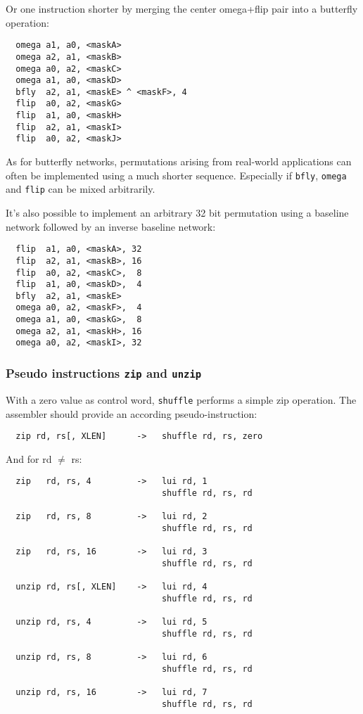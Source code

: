 Or one instruction shorter by merging the center omega+flip pair into a
butterfly operation:

\begin{verbatim}
  omega a1, a0, <maskA>
  omega a2, a1, <maskB>
  omega a0, a2, <maskC>
  omega a1, a0, <maskD>
  bfly  a2, a1, <maskE> ^ <maskF>, 4
  flip  a0, a2, <maskG>
  flip  a1, a0, <maskH>
  flip  a2, a1, <maskI>
  flip  a0, a2, <maskJ>
\end{verbatim}

As for butterfly networks, permutations arising from real-world applications
can often be implemented using a much shorter sequence. Especially if {\tt bfly},
{\tt omega} and {\tt flip} can be mixed arbitrarily.

It's also possible to implement an arbitrary 32 bit permutation using a
baseline network followed by an inverse baseline network:

\begin{verbatim}
  flip  a1, a0, <maskA>, 32
  flip  a2, a1, <maskB>, 16
  flip  a0, a2, <maskC>,  8
  flip  a1, a0, <maskD>,  4
  bfly  a2, a1, <maskE>
  omega a0, a2, <maskF>,  4
  omega a1, a0, <maskG>,  8
  omega a2, a1, <maskH>, 16
  omega a0, a2, <maskI>, 32
\end{verbatim}

\subsubsection{Pseudo instructions {\tt zip} and {\tt unzip}}

With a zero value as control word, {\tt shuffle} performs a simple zip
operation. The assembler should provide an according pseudo-instruction:

\begin{verbatim}
  zip rd, rs[, XLEN]      ->   shuffle rd, rs, zero
\end{verbatim}

And for rd $\neq$ rs:

\begin{verbatim}
  zip   rd, rs, 4         ->   lui rd, 1
                               shuffle rd, rs, rd

  zip   rd, rs, 8         ->   lui rd, 2
                               shuffle rd, rs, rd

  zip   rd, rs, 16        ->   lui rd, 3
                               shuffle rd, rs, rd

  unzip rd, rs[, XLEN]    ->   lui rd, 4
                               shuffle rd, rs, rd

  unzip rd, rs, 4         ->   lui rd, 5
                               shuffle rd, rs, rd

  unzip rd, rs, 8         ->   lui rd, 6
                               shuffle rd, rs, rd

  unzip rd, rs, 16        ->   lui rd, 7
                               shuffle rd, rs, rd
\end{verbatim}

